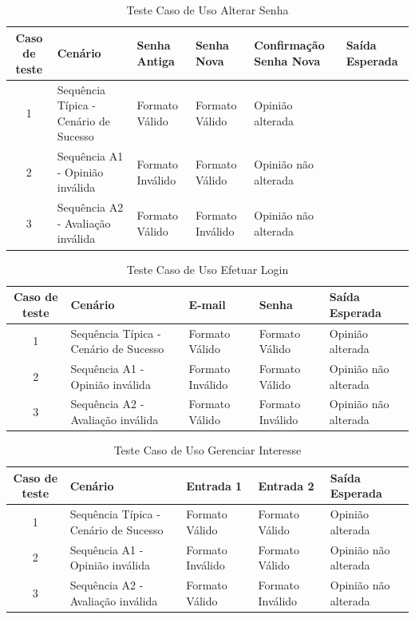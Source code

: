 \documentclass[a4paper,11pt]{article}
\begin{document}
	\begin{center}
	\begin{table}[H]
		\begin{tabularx}{\textwidth}{c|X|X|X|X|X}
			\textbf{Caso de teste} & \textbf{Cenário} & \textbf{Senha Antiga} & \textbf{Senha Nova} & \textbf{Confirmação Senha Nova} & \textbf{Saída Esperada} \\
			\hline
			1 & Sequência Típica - Cenário de Sucesso & Formato Válido & Formato Válido & Opinião alterada\\ \hline
			2 & Sequência A1 - Opinião inválida & Formato Inválido & Formato Válido & Opinião não alterada\\ \hline
			3 & Sequência A2 - Avaliação inválida & Formato Válido & Formato Inválido & Opinião não alterada\\ \hline
			
		\end{tabularx}
		\caption{Teste Caso de Uso Alterar Senha}
	\end{table}
	\end{center}
	
	\begin{center}
	\begin{table}[H]
		\begin{tabularx}{\textwidth}{c|X|X|X|X}
			\textbf{Caso de teste} & \textbf{Cenário} & \textbf{E-mail} & \textbf{Senha} & \textbf{Saída Esperada} \\
			\hline
			1 & Sequência Típica - Cenário de Sucesso & Formato Válido & Formato Válido & Opinião alterada\\ \hline
			2 & Sequência A1 - Opinião inválida & Formato Inválido & Formato Válido & Opinião não alterada\\ \hline
			3 & Sequência A2 - Avaliação inválida & Formato Válido & Formato Inválido & Opinião não alterada\\ \hline
			
		\end{tabularx}
		\caption{Teste Caso de Uso Efetuar Login}
	\end{table}
	\end{center}
	
	\begin{center}
	\begin{table}[H]
		\begin{tabularx}{\textwidth}{c|X|X|X|X}
			\textbf{Caso de teste} & \textbf{Cenário} & \textbf{Entrada 1} & \textbf{Entrada 2} & \textbf{Saída Esperada} \\
			\hline
			1 & Sequência Típica - Cenário de Sucesso & Formato Válido & Formato Válido & Opinião alterada\\ \hline
			2 & Sequência A1 - Opinião inválida & Formato Inválido & Formato Válido & Opinião não alterada\\ \hline
			3 & Sequência A2 - Avaliação inválida & Formato Válido & Formato Inválido & Opinião não alterada\\ \hline
			
		\end{tabularx}
		\caption{Teste Caso de Uso Gerenciar Interesse}
	\end{table}
	\end{center}
	
\end{document}

